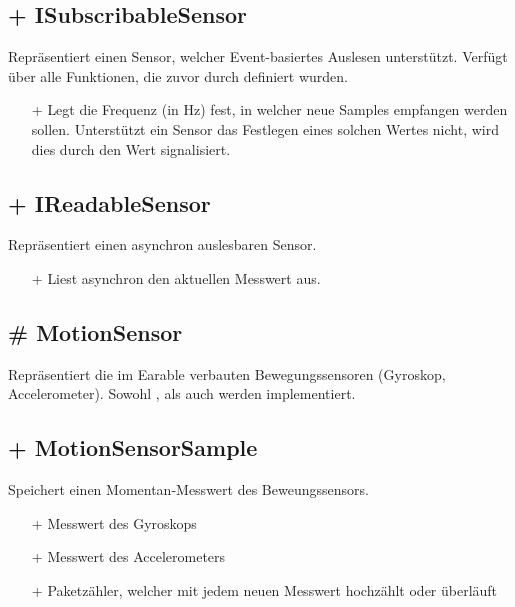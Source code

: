 \documentclass[../implementierung.tex]{subfiles}
\begin{document}
		\subsection{+ ISubscribableSensor}
			Repräsentiert einen Sensor, welcher Event-basiertes Auslesen unterstützt.
			Verfügt über alle Funktionen, die zuvor durch  definiert wurden.
			\begin{itemize}
				\item[+]{ Legt die Frequenz (in Hz) fest, in welcher neue Samples
					empfangen werden sollen. Unterstützt ein Sensor das Festlegen eines solchen Wertes nicht,
					wird dies durch den Wert  signalisiert.}
			\end{itemize}

		\subsection{+ IReadableSensor}
			Repräsentiert einen asynchron auslesbaren Sensor.
			\begin{itemize}
				\item[+]{ Liest asynchron den aktuellen Messwert aus.}
			\end{itemize}

		\subsection{\# MotionSensor}
			Repräsentiert die im Earable verbauten Bewegungssensoren (Gyroskop, Accelerometer).
			Sowohl , als auch  werden implementiert.

		\subsection{+ MotionSensorSample}
			Speichert einen Momentan-Messwert des Beweungssensors.
			\begin{itemize}
				\item[+]{ Messwert des Gyroskops}
				\item[+]{ Messwert des Accelerometers}
				\item[+]{ Paketzähler, welcher mit jedem neuen Messwert hochzählt oder überläuft}
			\end{itemize}
\end{document}
